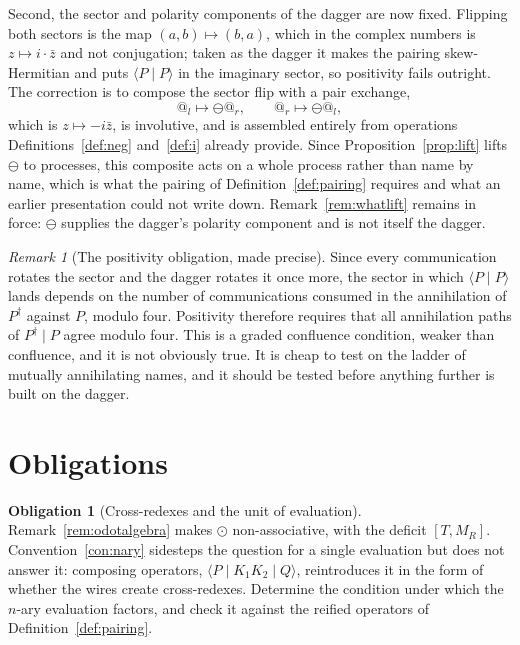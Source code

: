 \documentclass[11pt]{article}
\makeatletter
\theoremstyle{definition}
\newtheorem{obligation}{Obligation}
\theoremstyle{remark}
\newtheorem{remark}[theorem]{Remark}
\newcommand{\quo}[1]{\ensuremath{@_{#1}}}
\newcommand{\negop}{\ensuremath{\ominus}}
\makeatother
\begin{document}
Second, the sector and polarity components of the dagger are now fixed. Flipping
both sectors is the map $(a,b) \mapsto (b,a)$, which in the complex numbers is
$z \mapsto i \cdot \bar{z}$ and not conjugation; taken as the dagger it makes
the pairing skew-Hermitian and puts $\langle P \mid P \rangle$ in the imaginary
sector, so positivity fails outright. The correction is to compose the sector
flip with a pair exchange,
\[
  \quo{l} \mapsto \negop\quo{r}, \qquad \quo{r} \mapsto \negop\quo{l},
\]
which is $z \mapsto -i\bar{z}$, is involutive, and is assembled entirely from
operations Definitions~\ref{def:neg} and~\ref{def:i} already provide. Since
Proposition~\ref{prop:lift} lifts $\negop$ to processes, this composite acts on
a whole process rather than name by name, which is what the pairing of
Definition~\ref{def:pairing} requires and what an earlier presentation could not
write down. Remark~\ref{rem:whatlift} remains in force: $\negop$ supplies the
dagger's polarity component and is not itself the dagger.

\begin{remark}[The positivity obligation, made precise]
\label{rem:positivity}
Since every communication rotates the sector and the dagger rotates it once
more, the sector in which $\langle P \mid P \rangle$ lands depends on the number
of communications consumed in the annihilation of $P^\dagger$ against $P$,
modulo four. Positivity therefore requires that all annihilation paths of
$P^\dagger \mid P$ agree modulo four. This is a graded confluence condition,
weaker than confluence, and it is not obviously true. It is cheap to test on the
ladder of mutually annihilating names, and it should be tested before anything
further is built on the dagger.
\end{remark}

\section{Obligations}
\label{sec:obligations}

\begin{obligation}[Cross-redexes and the unit of evaluation]
\label{ob:assoc}
Remark~\ref{rem:odotalgebra} makes $\odot$ non-associative, with the deficit
$[T, M_R]$. Convention~\ref{con:nary} sidesteps the question for a single
evaluation but does not answer it: composing operators, $\langle P \mid K_1 K_2
\mid Q \rangle$, reintroduces it in the form of whether the wires create
cross-redexes. Determine the condition under which the $n$-ary evaluation
factors, and check it against the reified operators of
Definition~\ref{def:pairing}.
\end{obligation}
\end{document}
